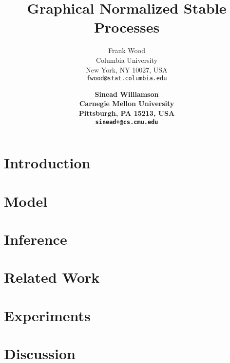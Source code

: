 \documentclass{article}
\title{Graphical Normalized Stable Processes }
\author{
Frank Wood\\
Columbia University\\
New York, NY 10027, USA \\
\texttt{fwood@stat.columbia.edu}
\and
\bf Sinead Williamson\\
 Carnegie Mellon University\\
Pittsburgh, PA 15213, USA\\
\texttt{sinead+@cs.cmu.edu} 
}
\begin{document}
\maketitle

\begin{abstract}

\end{abstract}

\section{Introduction}
\label{sec:introduction}







\section{Model}
\label{sec:model}


\section{Inference}
\label{sec:inference}


\section{Related Work}

\label{sec:related_work} 


\section{Experiments}

\label{sec:experiments}



\section{Discussion}
\label{sec:discussion}



\begin{small}  




\end{small} 
\end{document}
